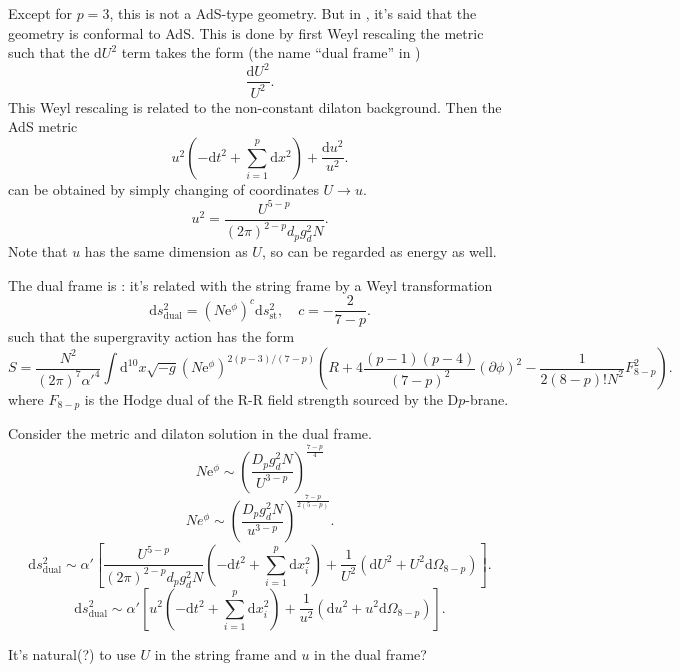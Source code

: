 Except for $p=3$, this is not a AdS-type geometry.
But in , it's said that the geometry is conformal to AdS.
This is done by first Weyl rescaling the metric such that the $\mathrm{d}U^2$ term takes the form (the name ``dual frame'' in )
\[
	\frac{\mathrm{d}U^2}{U^2}
.\] 
This Weyl rescaling is related to the non-constant dilaton background.
Then the AdS metric
\[
	u^2 \left( - \mathrm{d}t^2 + \sum_{i=1}^p \mathrm{d}x^2 \right)  
	+	\frac{\mathrm{d}u^2}{u^2}
.\] 
can be obtained by simply changing of coordinates $U\to u$.
\[
	u^2 = \frac{U^{5-p}}{(2\pi)^{2-p} d_p g_d^2 N}
.\] 
Note that $u$ has the same dimension as $U$, so can be regarded as energy as well.

The dual frame is :
it's related with the string frame by a Weyl transformation
\[
	\mathrm{d}s_{\text{dual}}^2 = (N \mathrm{e}^{\phi})^c \mathrm{d}s_{\text{st}}^2,\quad c = - \frac{2}{7-p}
.\] 
such that the supergravity action has the form
\[
	S = \frac{N^2}{(2\pi)^7 \alpha'^4}
	\int \mathrm{d}^{10} x \sqrt{-g}
	(N \mathrm{e}^\phi)^{2(p-3) / (7-p)}
	\left( R + 4 \frac{(p-1)(p-4)}{(7-p)^2} (\partial\phi)^2 - 
	\frac{1}{2(8-p)! N^2} F_{8-p}^2\right) 
.\] 
where $F_{8-p}$ is the Hodge dual of the R-R field strength sourced by the D$p$-brane.

Consider the metric and dilaton solution in the dual frame.
\[
	N \mathrm{e}^\phi \sim \left(\frac{D_p g_d^2 N}{U^{3-p}}\right)^{\frac{7-p}{4}}
\] 
\[
	N e^\phi \sim \left( \frac{D_p g_d^2 N}{u^{3-p}} \right)^{\frac{7-p}{2(5-p)}}
.\] 
\[
	\mathrm{d}s_{\text{dual}}^2 \sim \alpha' \left[\frac{U^{5-p}}{(2\pi)^{2-p} d_p g_d^2 N} 
		\left( - \mathrm{d}t^2 + \sum_{i=1}^p \mathrm{d}x_i^2 \right) 
	+ \frac{1}{U^2}\left( \mathrm{d}U^2 + U^2 \mathrm{d}\Omega_{8-p} \right)\right]
.\] 
\[
	\mathrm{d}s_{\text{dual}}^2 \sim \alpha' \left[ u^2
		\left( - \mathrm{d}t^2 + \sum_{i=1}^p \mathrm{d}x_i^2 \right) 
	+ \frac{1}{u^2}\left( \mathrm{d}u^2 + u^2 \mathrm{d}\Omega_{8-p} \right)\right]
.\] 

\begin{question}
	It's natural(?) to use $U$ in the string frame and $u$ in the dual frame?
\end{question}

